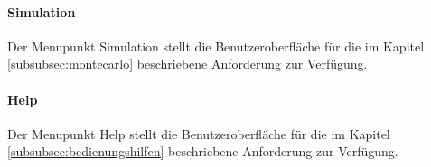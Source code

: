 \paragraph{Simulation}
Der Menupunkt Simulation stellt die Benutzeroberfläche für die im Kapitel \ref{subsubsec:montecarlo} beschriebene Anforderung zur Verfügung.

\paragraph{Help}
Der Menupunkt Help stellt die Benutzeroberfläche für die im Kapitel \ref{subsubsec:bedienungshilfen} beschriebene Anforderung zur Verfügung.


\begin{comment}
\subsubsection{Eingabefenster} \label{subsubsec:eingabefenster}

Das Eingabefenster ist dazu da, die einzelnen parasitären Filterparameter einzustellen und die Toleranz von ± 30\% mit einem Schieberegler zu variieren (F6, Tabelle:\ref{tab:ziele}) . Die  Textfelder werden vor Fehleingaben geschützt (B1, Tabelle:\ref{tab:ziele}) und unterstützt spezielle Eingabeformen (z.B 10 milli=10m) (G2, Tabelle:\ref{tab:ziele})

\subsubsection{CM/DM Plot} \label{subsubsec:CM_DMplot}

Um die Berechnungen zu visualisieren werden 2 Plots für CM und DM verwendet(G4, Tabelle:\ref{tab:ziele}) Die Plots sind für die bessere Darstellung in 3 Frequenzbereiche aufgeteilt:0 kHz bis 500 kHz, 500 kHz bis 5 MHz und 5 MHz bis 30 MHz(G3, Tabelle:\ref{tab:ziele}). Mit einem Rechtsklick auf den Plot können verschiedene Optionen ausgewählt werden. So können die Eigenschaften (Farbe, Darstellung, Schrift usw.) und der Zoom individuell eingestellt werden(Fehlt bei Zielen). Der Plot kann auch direkt in eine .png Datei abgespeichert oder gedruckt werden(B2, Tabelle:\ref{tab:ziele}). Diese Optionen sind in der Abbildung \ref{fig:PlotSettings} ersichtlich.

\begin{figure}[H]
	\centering
	\texttt{[image: PlotSettings.png]}
	\caption{Ploteinstellungen}
	\label{fig:PlotSettings}
\end{figure} 



\end{comment}
